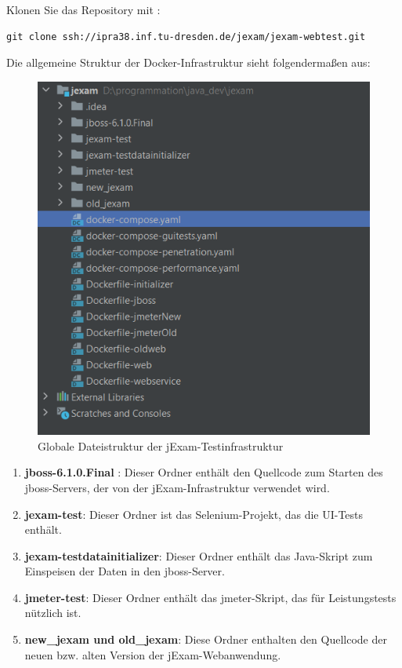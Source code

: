Klonen Sie das Repository mit :
\begin{lstlisting}[caption={Clone repository},label={lst:clone repo}]
git clone ssh://ipra38.inf.tu-dresden.de/jexam/jexam-webtest.git
\end{lstlisting}

Die allgemeine Struktur der Docker-Infrastruktur
sieht folgendermaßen aus:

\begin{figure}[H]
    \centering
    \includegraphics[scale=1]{images/docker-files}
    \caption{Globale Dateistruktur der jExam-Testinfrastruktur} \label{fig:global}
\end{figure}

\begin{enumerate}

    \item \textbf{jboss-6.1.0.Final} : Dieser Ordner
    enthält den Quellcode zum Starten des jboss-Servers, der von der jExam-Infrastruktur verwendet wird.

    \item \textbf{jexam-test}: Dieser Ordner ist das
    Selenium-Projekt, das die UI-Tests enthält.

    \item \textbf{jexam-testdatainitializer}: Dieser
    Ordner enthält das Java-Skript zum Einspeisen der
    Daten in den jboss-Server.

    \item \textbf{jmeter-test}: Dieser Ordner enthält
    das jmeter-Skript, das für Leistungstests nützlich
    ist.

    \item \textbf{new\_jexam und old\_jexam}: Diese
    Ordner enthalten den Quellcode der neuen bzw.
    alten Version der jExam-Webanwendung.

\end{enumerate}

